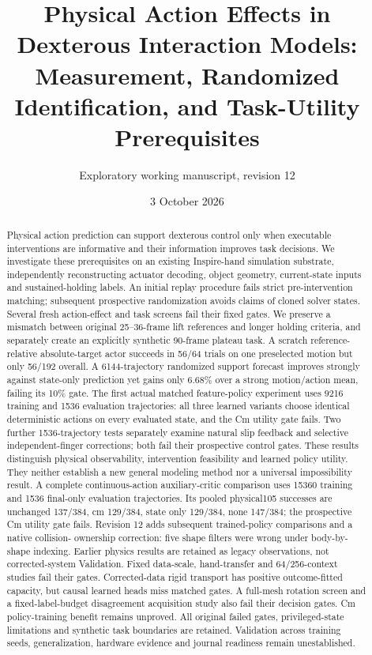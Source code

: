 \documentclass[10pt]{article}
\title{Physical Action Effects in Dexterous Interaction Models:\\Measurement, Randomized Identification, and Task-Utility Prerequisites}
\author{Exploratory working manuscript, revision 12}
\date{3 October 2026}
\begin{document}
\maketitle
\begin{abstract}
Physical action prediction can support dexterous control only when executable
interventions are informative and their information improves task decisions.
We investigate these prerequisites on an existing Inspire-hand simulation
substrate, independently reconstructing actuator decoding, object geometry,
current-state inputs and sustained-holding labels. An initial replay procedure
fails strict pre-intervention matching; subsequent prospective randomization
avoids claims of cloned solver states. Several fresh action-effect and task
screens fail their fixed gates. We preserve a mismatch between original
25--36-frame lift references and longer holding criteria, and separately create
an explicitly synthetic 90-frame plateau task. A scratch reference-relative
absolute-target actor succeeds in 56/64 trials on one preselected motion but only
56/192 overall. A 6144-trajectory randomized support forecast improves strongly
against state-only prediction yet gains only 6.68\% over a strong motion/action
mean, failing its 10\% gate. The first actual matched feature-policy experiment
uses 9216 training and 1536 evaluation trajectories: all three learned variants
choose identical deterministic actions on every evaluated state, and the Cm
utility gate fails. Two further 1536-trajectory tests separately examine natural
slip feedback and selective independent-finger corrections; both fail their
prospective control gates. These results distinguish physical observability,
intervention feasibility and learned policy utility. They neither establish a
new general modeling method nor a universal impossibility result. A complete continuous-action auxiliary-critic comparison uses 15360 training and 1536 final-only evaluation trajectories. Its pooled physical105 successes are unchanged 137/384, cm 129/384, state only 129/384, none 147/384; the prospective Cm utility gate fails. 
Revision 12 adds subsequent trained-policy comparisons and a native collision-
ownership correction: five shape filters were wrong under body-by-shape indexing.
Earlier physics results are retained as legacy observations, not corrected-system
Validation. Fixed data-scale, hand-transfer and 64/256-context studies fail their
gates. Corrected-data rigid transport has positive outcome-fitted capacity, but
causal learned heads miss matched gates. A full-mesh rotation screen and a
fixed-label-budget disagreement acquisition study also fail their decision gates.
Cm policy-training benefit remains unproved.
All original failed gates, privileged-state limitations and synthetic task
boundaries are retained. Validation across training seeds, generalization,
hardware evidence and journal readiness remain unestablished.
\end{abstract}
\end{document}
